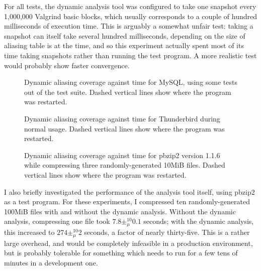 For all tests, the dynamic analysis tool was configured to take one
snapshot every 1,000,000 Valgrind basic blocks, which usually
corresponds to a couple of hundred milliseconds of execution
time. This is arguably a somewhat unfair test: taking a snapshot can
itself take several hundred milliseconds, depending on the size of
aliasing table is at the time, and so this experiment actually spent
most of its time taking snapshots rather than running the test
program.  A more realistic test would probably show faster
convergence.

\begin{figure}
  \caption{Dynamic aliasing coverage against time for MySQL, using
    some tests out of the test suite.  Dashed vertical lines show where the
    program was restarted.}
  \label{fig:eval:dyn_convergence:mysqld}
\end{figure}

\begin{figure}
  \caption{Dynamic aliasing coverage against time for Thunderbird
    during normal usage.  Dashed vertical lines show where the program was
    restarted.}
  \label{fig:eval:dyn_convergence:thunderbird}
\end{figure}

\begin{figure}
  \caption{Dynamic aliasing coverage against time for pbzip2 version
    1.1.6 while compressing three randomly-generated 10MiB files.
    Dashed vertical lines show where the program was restarted.}
  \label{fig:eval:dyn_convergence:pbzip2}
\end{figure}

I also briefly investigated the performance of the analysis tool
itself, using pbzip2 as a test program.  For these experiments, I
compressed ten randomly-generated 100MiB files with and without the
dynamic analysis.  Without the dynamic analysis, compressing one file
took $7.8 \pm_\mu^{10} 0.1$ seconds; with the dynamic analysis, this
increased to $274 \pm_\mu^{10} 2$ seconds, a factor of nearly thirty-five.
This is a rather large overhead, and would be completely infeasible in
a production environment, but is probably tolerable for something
which needs to run for a few tens of minutes in a development one.

